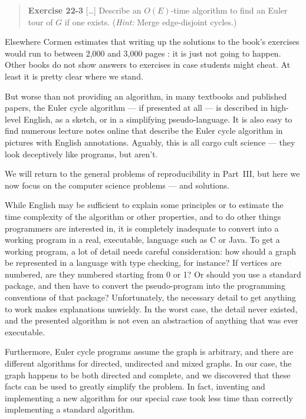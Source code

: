 \documentclass[preprint,times]{elsarticle}
\begin{document}
\begin{quote}\sf
\textbf{Exercise 22-3} [\ldots]
Describe an $O(E)$-time algorithm to find an Euler tour of $G$ if one exists. (\emph{Hint:\/} Merge edge-disjoint cycles.)\hfill\cite{cormen} 
\end{quote}

Elsewhere Cormen estimates that writing up the solutions to the book's exercises would run to between 2,000 and 3,000 pages \cite{cormen-web}: it is just not going to happen. Other books do not show answers to exercises in case students might cheat. At least it is pretty clear where we stand. 

But worse than not providing an algorithm, in many textbooks and published papers, the Euler cycle algorithm --- if presented at all ---  is described in high-level English, as a sketch, or in a simplifying pseudo-language. It is also easy to find numerous lecture notes online that describe the Euler cycle algorithm in pictures with English annotations. Aguably, this is all cargo cult science --- they look deceptively like programs, but aren't. 

We will return to the general problems of reproducibility in Part~III, but here we now focus on the computer science problems --- and solutions.

While English may be sufficient to explain some principles or to estimate the time complexity of the algorithm or other properties, and to do other things programmers are interested in, it is completely inadequate to convert into a working program in a real, executable, language such as C or Java. To get a working program, a lot of detail needs careful consideration: how should a graph be represented in a language with type checking, for instance? If vertices are numbered, are they numbered starting from 0 or 1? Or should you use a standard package, and then have to convert the pseudo-program into the programming conventions of that package? Unfortunately, the necessary detail to get anything to work makes explanations unwieldy. In the worst case, the detail never existed, and the presented algorithm is not even an abstraction of anything that was ever executable. 

Furthermore, Euler cycle programs assume the graph is arbitrary, and there are different algorithms for directed, undirected and mixed graphs. In our case, the graph happens to be both directed and complete, and we discovered that these facts can be used to greatly simplify the problem. In fact, inventing and implementing a new algorithm for our special case took less time than correctly implementing a standard algorithm. 
\end{document}

